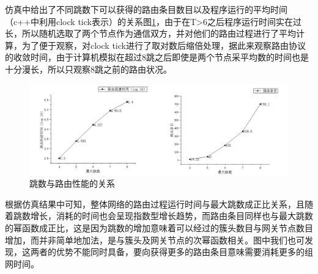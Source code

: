 \documentclass[a4paper,AutoFakeBold,oneside,12pt]{book}
\begin{document}
  仿真中给出了不同跳数下可以获得的路由条目数目以及程序运行的平均时间（c++中利用clock tick表示）的关系图\ref{luyoushumu}，由于在T>6之后程序运行时间实在过长，所以随机选取了两个节点作为通信双方，并对他们的路由过程进行了平均计算，为了便于观察，对clock tick进行了取对数后缩倍处理，据此来观察路由协议的收敛时间，由于计算机模拟在超过8跳之后即使是两个节点采平均数的时间也是十分漫长，所以只观察8跳之前的路由状况。
   \begin{figure}[htbp]
\centering %
\includegraphics[scale=0.45]{pictures/luyoushumu.png} 
\caption{跳数与路由性能的关系} %
\label{luyoushumu}
\end{figure}
  根据仿真结果中可知，整体网络的路由过程运行时间与最大跳数成正比关系，且随着跳数增长，消耗的时间也会呈现指数型增长趋势，而路由条目同样也与最大跳数的幂函数成正比，这是因为跳数的增加意味着可以经过的簇头数目与网关节点数目增加，而并非简单地加法，是与簇头及网关节点的次幂函数相关。图中我们也可发现，这两者的优势不能同时具备，要向获得更多的路由条目意味需要消耗更多的组网时间。
  
\end{document}
